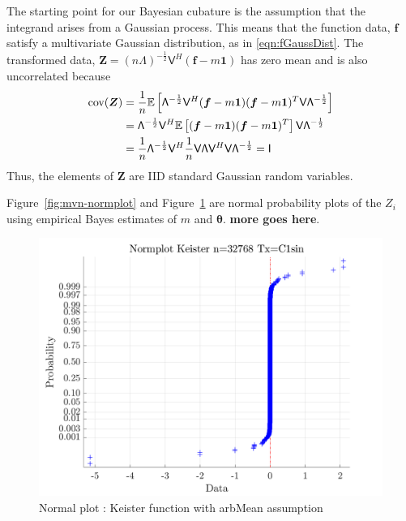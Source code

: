 \documentclass[twocolumn]{svjour3}          %
\newcommand{\bm}[1]{\boldsymbol{#1}}
\newcommand{\Ex}{\mathbb{E}}
\newcommand{\vtheta}{{\bm{\theta}}}
\newcommand{\vf}{\bm{f}}
\newcommand{\vZ}{\bm{Z}}
\newcommand{\vone}{\bm{1}}
\newcommand{\cov}{{\textup{cov}}}
\newcommand{\mLambda}{\mathsf{\Lambda}}
\newcommand{\mV}{\mathsf{V}}
\newcommand\figref{Figure~\ref}
\begin{document}
The starting point for our Bayesian cubature is the assumption that the integrand arises from a Gaussian process. This means that the function data, $\vf$ satisfy a multivariate Gaussian distribution, as in \eqref{eqn:fGaussDist}.  The transformed data, $\vZ = ( n\mLambda)^{-\frac 12} \mV^H(\vf - m \vone)$ has zero mean and is also uncorrelated because
\begin{align*}
\cov (\vZ) 
&= \frac 1n \Ex\left[  
\mLambda^{-\frac 12} \mV^H (\vf - m \vone)
(\vf - m \vone)^T \mV \mLambda^{-\frac 12}
\right]
\\
&=
 \mLambda^{-\frac 12} \mV^H 
\Ex\left[ (\vf - m \vone)
(\vf - m \vone)^T \right] \mV \mLambda^{-\frac 12}
\\
&=
\frac{1}{n} \mLambda^{-\frac 12} \mV^H 
\frac 1n \mV \mLambda \mV^H \mV \mLambda^{-\frac 12}
 = \mathsf{I}
\end{align*}
Thus, the elements of $\vZ$ are IID standard Gaussian random variables.  

\figref{fig:mvn-normplot} and \figref{fig:keister-normplot} are normal probability plots of the $Z_i$ using empirical Bayes estimates of $m$ and $\vtheta$. \textbf{more goes here}.



\begin{figure}
	\centering
	\includegraphics[width=0.9\linewidth]{"figures/arbMean/Keister/C1sin/Keister Normplot d_2 bernoulli_2 Period_C1sin n_32768"}
	\caption{Normal plot : Keister function with arbMean assumption}
	\label{fig:keister-normplot}
\end{figure}
\end{document}
